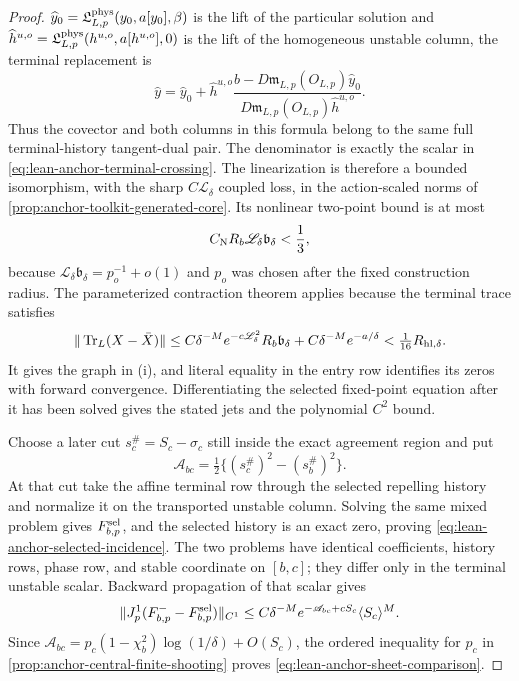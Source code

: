 \begin{proof}
\(\widehat y_0=\mathfrak L^{\rm phys}_{L,p}(y_0,a[y_0],\beta)\) is the
lift of the particular solution and
\(\widehat h^{u,o}=\mathfrak L^{\rm phys}_{L,p}
(h^{u,o},a[h^{u,o}],0)\) is the lift of the homogeneous unstable column,
the terminal replacement is
\begin{equation}
 \widehat y=\widehat y_0+\widehat h^{u,o}
 \frac{b-D\mathfrak m_{L,p}(O_{L,p})\widehat y_0}
      {D\mathfrak m_{L,p}(O_{L,p})\widehat h^{u,o}}.
 \label{eq:lean-anchor-terminal-replacement}
\end{equation}
Thus the covector and both columns in this formula belong to the same full
terminal-history tangent-dual pair.  The denominator is exactly the scalar
in
\cref{eq:lean-anchor-terminal-crossing}.  The linearization is therefore a
bounded isomorphism, with the sharp \(C\mathscr L_\delta\) coupled loss, in
the action-scaled norms of
\cref{prop:anchor-toolkit-generated-core}.  Its nonlinear two-point bound is
at most
\[
 C_{\rm N}R_b\mathscr L_\delta\mathfrak b_\delta<\frac13,
\]
because
\(\mathscr L_\delta\mathfrak b_\delta=p_o^{-1}+o(1)\) and \(p_o\)
was chosen after the fixed construction radius.  The parameterized
contraction theorem applies because the terminal trace satisfies
\begin{equation}
 \|\operatorname{Tr}_L(X-\bar X)\|
 \le C\delta^{-M}e^{-c\mathscr L_\delta^2}
       R_b\mathfrak b_\delta+C\delta^{-M}e^{-a/\delta}
 <\tfrac1{16}R_{{\rm hl},\delta}.
 \label{eq:lean-anchor-terminal-localization}
\end{equation}
It gives the graph in (i), and literal equality in the
entry row identifies its zeros with forward convergence.  Differentiating
the selected fixed-point equation after it has been solved gives the stated
jets and the polynomial \(C^2\) bound.

Choose a later cut
\(s_c^\#=S_c-\sigma_c\) still inside the exact agreement region and put
\[
 \mathscr A_{bc}=\tfrac12\{(s_c^\#)^2-(s_b^\#)^2\}.
\]
At that cut take the affine terminal row through the selected repelling
history and normalize it on the transported unstable column.  Solving the
same mixed problem gives \(F_{b,p}^{\rm sel}\), and the selected history is
an exact zero, proving \cref{eq:lean-anchor-selected-incidence}.  The two
problems have identical coefficients, history rows, phase row, and stable
coordinate on \([b,c]\); they differ only in the terminal unstable scalar.
Backward propagation of that scalar gives
\[
 \|J_p^1(F_{b,p}^--F_{b,p}^{\rm sel})\|_{C^1}
 \le C\delta^{-M}e^{-\mathscr A_{bc}+cS_c}
       \langle S_c\rangle^M.
\]
Since
\(\mathscr A_{bc}=p_c(1-\chi_b^2)\log(1/\delta)+O(S_c)\), the ordered
inequality for \(p_c\) in \cref{prop:anchor-central-finite-shooting} proves
\cref{eq:lean-anchor-sheet-comparison}.


\end{proof}
